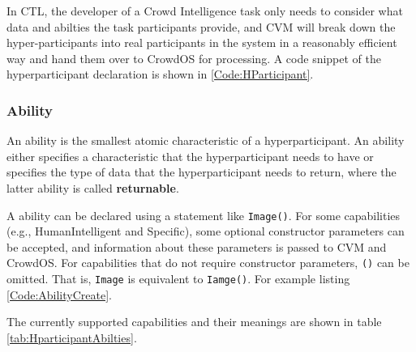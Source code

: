 In CTL, the developer of a Crowd Intelligence task only needs to consider what data and abilties the task participants provide, and CVM will break down the hyper-participants into real participants in the system in a reasonably efficient way and hand them over to CrowdOS for processing. A code snippet of the hyperparticipant declaration is shown in \ref{Code:HParticipant}.



\subsubsection{Ability}
An ability is the smallest atomic characteristic of a hyperparticipant. An ability either specifies a characteristic that the hyperparticipant needs to have or specifies the type of data that the hyperparticipant needs to return, where the latter ability is called \textbf{returnable}.

A ability can be declared using a statement like \texttt{Image()}. For some capabilities (e.g., HumanIntelligent and Specific), some optional constructor parameters can be accepted, and information about these parameters is passed to CVM and CrowdOS. For capabilities that do not require constructor parameters, \texttt{()} can be omitted. That is, \texttt{Image} is equivalent to \texttt{Iamge()}. For example listing \ref{Code:AbilityCreate}.



The currently supported capabilities and their meanings are shown in table \ref{tab:HparticipantAbilties}.

